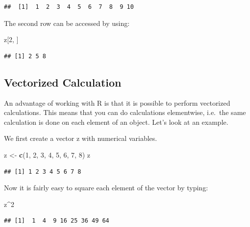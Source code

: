 \documentclass[]{book}
\newenvironment{Shaded}{\begin{snugshade}}{\end{snugshade}}
\newcommand{\KeywordTok}[1]{\textcolor[rgb]{0.13,0.29,0.53}{\textbf{#1}}}
\newcommand{\DecValTok}[1]{\textcolor[rgb]{0.00,0.00,0.81}{#1}}
\newcommand{\StringTok}[1]{\textcolor[rgb]{0.31,0.60,0.02}{#1}}
\newcommand{\OperatorTok}[1]{\textcolor[rgb]{0.81,0.36,0.00}{\textbf{#1}}}
\newcommand{\NormalTok}[1]{#1}
\theoremstyle{definition}
\theoremstyle{definition}
\theoremstyle{definition}
\theoremstyle{remark}
\begin{document}
\begin{verbatim}
##  [1]  1  2  3  4  5  6  7  8  9 10
\end{verbatim}

The second row can be accessed by using:

\begin{Shaded}
\begin{Highlighting}[]
\NormalTok{z[}\DecValTok{2}\NormalTok{, ]}
\end{Highlighting}
\end{Shaded}

\begin{verbatim}
## [1] 2 5 8
\end{verbatim}

\subsection{Vectorized Calculation}\label{vectorized-calculation}

An advantage of working with R is that it is possible to perform
vectorized calculations. This means that you can do calculations
elementwise, i.e.~the same calculation is done on each element of an
object. Let's look at an example.

We first create a vector z with numerical variables.

\begin{Shaded}
\begin{Highlighting}[]
\NormalTok{z <-}\StringTok{ }\KeywordTok{c}\NormalTok{(}\DecValTok{1}\NormalTok{, }\DecValTok{2}\NormalTok{, }\DecValTok{3}\NormalTok{, }\DecValTok{4}\NormalTok{, }\DecValTok{5}\NormalTok{, }\DecValTok{6}\NormalTok{, }\DecValTok{7}\NormalTok{, }\DecValTok{8}\NormalTok{)}
\NormalTok{z}
\end{Highlighting}
\end{Shaded}

\begin{verbatim}
## [1] 1 2 3 4 5 6 7 8
\end{verbatim}

Now it is fairly easy to square each element of the vector by typing:

\begin{Shaded}
\begin{Highlighting}[]
\NormalTok{z}\OperatorTok{^}\DecValTok{2}
\end{Highlighting}
\end{Shaded}

\begin{verbatim}
## [1]  1  4  9 16 25 36 49 64
\end{verbatim}
\end{document}
